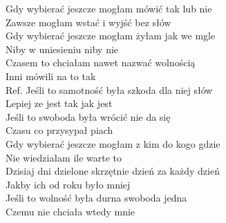 
Gdy wybierać jeszcze mogłam mówić tak lub nie \\
Zawsze mogłam wstać i wyjść bez słów \\
Gdy wybierać jeszcze mogłam żyłam jak we mgle \\
Niby w uniesieniu niby nie \\
Czasem to chciałam nawet nazwać wolnością \\
Inni mówili na to tak \\
\hops
Ref. Jeśli to samotność była szkoda dla niej słów \\
 Lepiej ze jest tak jak jest \\
 Jeśli to swoboda była wrócić nie da się \\
 Czasu co przysypał piach \\
\hops
Gdy wybierać jeszcze mogłam z kim do kogo gdzie \\
Nie wiedziałam ile warte to \\
Dzisiaj dni dzielone skrzętnie dzień za każdy dzień \\
Jakby ich od roku było mniej \\
Jeśli to wolność była durna swoboda jedna \\
Czemu nie chciała wtedy mnie